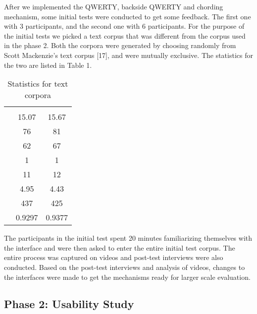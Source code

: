 After we implemented the QWERTY, backside QWERTY and chording mechanism, some initial tests were conducted to get some feedback. The first one with 3 participants, and the second one with 6 participants. For the purpose of the initial tests we picked a text corpus that was different from the corpus used in the phase 2. Both the corpora were generated by choosing randomly from Scott Mackenzie's text corpus [17], and were mutually exclusive. The statistics for the two are listed in Table 1.

\begin{table}
	\centering
		\begin{tabular}{rcc}
		                         & \begin{minipage}{2cm} \centering \color{grey}{Study corpus}\end{minipage} & \begin{minipage}{2cm} \centering \color{grey}{Initial test corpus}\end{minipage}  \\ 
			 \color{grey}{Average phrase length} & 15.07 & 15.67 \\ 
			 \color{grey}{Number of words} & 76 & 81 \\ 
			 \color{grey}{Unique words} & 62 & 67 \\ 
			 \color{grey}{Min. length of word} & 1 & 1 \\ 
			 \color{grey}{Max. length of word} & 11 & 12 \\ 
			 \color{grey}{Average word length} & 4.95 & 4.43 \\ 
			 \color{grey}{Number of characters} & 437 & 425 \\ 
			 \color{grey}{Correlation with English} & 0.9297 & 0.9377 \\ 
		\end{tabular}
	\caption{Statistics for text corpora}
	\label{tab:StatisticsForTextCorpora}
\end{table}

The participants in the initial test spent 20 minutes familiarizing themselves with the interface and were then asked to enter the entire initial test corpus. The entire process was captured on videos and post-test interviews were also conducted. Based on the post-test interviews and analysis of videos, changes to the interfaces were made to get the mechanisms ready for larger scale evaluation.

\subsection{Phase 2: Usability Study}
